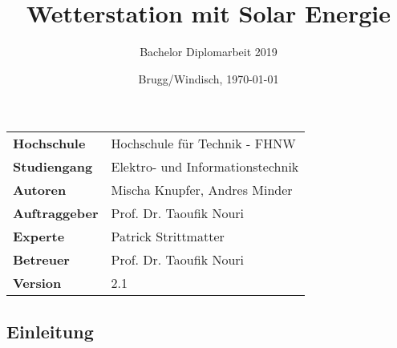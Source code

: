 \documentclass[final]{fhnwreport}       %
\title{\Huge{\textbf{Wetterstation mit Solar Energie}}\\}          %
\author{\huge{Bachelor Diplomarbeit 2019}}          %
\date{Brugg/Windisch, \today}             %
\begin{document}
\maketitle
\vspace*{-0.5cm}						    %
\vfill
\begin{figure}[H]
\centering
\end{figure}
\vfill

{
\renewcommand\arraystretch{2}
\begin{center}
\begin{tabular}{p{4cm} l}
\textbf{Hochschule}				&	Hochschule für Technik - FHNW\\
\textbf{Studiengang}			&	Elektro- und Informationstechnik\\
\textbf{Autoren}				&	Mischa Knupfer, Andres Minder\\
\textbf{Auftraggeber}			&	Prof. Dr. Taoufik Nouri\\
\textbf{Experte}				&	Patrick Strittmatter\\
\textbf{Betreuer}				&	Prof. Dr. Taoufik Nouri\\
\textbf{Version}				&	2.1 %
\end{tabular}
\end{center}
}

\clearpage
			


\tableofcontents
\clearpage


\cleardoublepage
\thispagestyle{empty}
\vspace*{4cm}
\begin{center}
	\section{Einleitung}
	\label{sec:EinleitenderTeil}
\end{center}
\newpage




\end{document}
